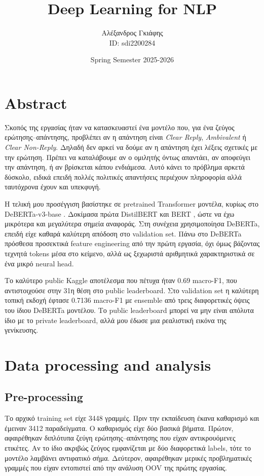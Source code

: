 \documentclass[12pt]{fphw}
\title{Deep Learning for NLP}
\author{Αλέξανδρος Γκιάφης \\ID: sdi2200284}
\date{Spring Semester 2025-2026}
\institute{National and Kapodistrian University of Athens \\ Department of Informatics and Telecommunications}
\begin{document}
\maketitle

{
  \hypersetup{linkcolor=black}
  \tableofcontents
}
\newpage

\section{Abstract}

Σκοπός της εργασίας ήταν να κατασκευαστεί ένα μοντέλο που, για ένα ζεύγος ερώτησης--απάντησης, προβλέπει αν η απάντηση είναι \emph{Clear Reply}, \emph{Ambivalent} ή \emph{Clear Non-Reply}. Δηλαδή δεν αρκεί να δούμε αν η απάντηση έχει λέξεις σχετικές με την ερώτηση. Πρέπει να καταλάβουμε αν ο ομιλητής όντως απαντάει, αν αποφεύγει την απάντηση, ή αν βρίσκεται κάπου ενδιάμεσα. Αυτό κάνει το πρόβλημα αρκετά δύσκολο, ειδικά επειδή πολλές πολιτικές απαντήσεις περιέχουν πληροφορία αλλά ταυτόχρονα έχουν και υπεκφυγή.

Η τελική μου προσέγγιση βασίστηκε σε pretrained Transformer μοντέλα, κυρίως στο DeBERTa-v3-base \cite{he2021deberta}. Δοκίμασα πρώτα DistilBERT \cite{sanh2019distilbert} και BERT \cite{devlin2019bert}, ώστε να έχω μικρότερα και μεγαλύτερα σημεία αναφοράς. Στη συνέχεια χρησιμοποίησα DeBERTa, επειδή είχε καθαρά καλύτερη απόδοση στο validation set. Πάνω στο DeBERTa πρόσθεσα προσεκτικά feature engineering από την πρώτη εργασία, όχι όμως βάζοντας τεχνητά tokens μέσα στο κείμενο, αλλά ως ξεχωριστά αριθμητικά χαρακτηριστικά σε ένα μικρό neural head.

Το καλύτερο public Kaggle αποτέλεσμα που πέτυχα ήταν 0.69 macro-F1, που αντιστοιχούσε στην 31η θέση στο public leaderboard. Στο validation set η καλύτερη τοπική εκδοχή έφτασε 0.7136 macro-F1 με ensemble από τρεις διαφορετικές όψεις του ίδιου DeBERTa μοντέλου. Το public leaderboard μπορεί να μην είναι απόλυτα ίδιο με το private leaderboard, αλλά μου έδωσε μια ρεαλιστική εικόνα της γενίκευσης.

\section{Data processing and analysis}

\subsection{Pre-processing}

Το αρχικό training set είχε 3448 γραμμές. Πριν την εκπαίδευση έκανα καθαρισμό και έμειναν 3412 παραδείγματα. Ο καθαρισμός είχε δύο βασικά βήματα. Πρώτον, αφαιρέθηκαν διπλότυπα ζεύγη ερώτησης--απάντησης που είχαν αντικρουόμενες ετικέτες. Αν το ίδιο ακριβώς ζεύγος εμφανίζεται με δύο διαφορετικά labels, τότε το μοντέλο λαμβάνει αντιφατικό σήμα. Δεύτερον, αφαιρέθηκαν μερικές προβληματικές γραμμές που είχαν εντοπιστεί από την ανάλυση OOV της πρώτης εργασίας.
\end{document}
